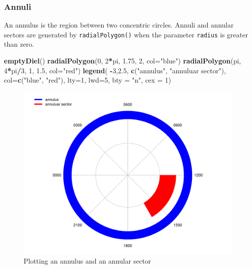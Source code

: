 \documentclass[
]{book}
\newenvironment{Shaded}{\begin{snugshade}}{\end{snugshade}}
\newcommand{\AttributeTok}[1]{\textcolor[rgb]{0.13,0.29,0.53}{#1}}
\newcommand{\DecValTok}[1]{\textcolor[rgb]{0.00,0.00,0.81}{#1}}
\newcommand{\FloatTok}[1]{\textcolor[rgb]{0.00,0.00,0.81}{#1}}
\newcommand{\FunctionTok}[1]{\textcolor[rgb]{0.13,0.29,0.53}{\textbf{#1}}}
\newcommand{\NormalTok}[1]{#1}
\newcommand{\SpecialCharTok}[1]{\textcolor[rgb]{0.81,0.36,0.00}{\textbf{#1}}}
\newcommand{\StringTok}[1]{\textcolor[rgb]{0.31,0.60,0.02}{#1}}
\begin{document}
\hypertarget{annuli}{%
\subsubsection{Annuli}\label{annuli}}

An annulus is the region between two concentric circles. Annuli and annular sectors are generated by \texttt{radialPolygon()} when the parameter \texttt{radius} is greater than zero.

\begin{Shaded}
\begin{Highlighting}[]
\FunctionTok{emptyDiel}\NormalTok{()}
\FunctionTok{radialPolygon}\NormalTok{(}\DecValTok{0}\NormalTok{, }\DecValTok{2}\SpecialCharTok{*}\NormalTok{pi, }\FloatTok{1.75}\NormalTok{, }\DecValTok{2}\NormalTok{, }\AttributeTok{col=}\StringTok{"blue"}\NormalTok{)}
\FunctionTok{radialPolygon}\NormalTok{(pi, }\DecValTok{4}\SpecialCharTok{*}\NormalTok{pi}\SpecialCharTok{/}\DecValTok{3}\NormalTok{, }\DecValTok{1}\NormalTok{, }\FloatTok{1.5}\NormalTok{, }\AttributeTok{col=}\StringTok{"red"}\NormalTok{)}
\FunctionTok{legend}\NormalTok{(}
  \SpecialCharTok{{-}}\DecValTok{3}\NormalTok{,}\FloatTok{2.5}\NormalTok{,}
  \FunctionTok{c}\NormalTok{(}\StringTok{"annulus"}\NormalTok{, }\StringTok{"annuluar sector"}\NormalTok{),}
  \AttributeTok{col=}\FunctionTok{c}\NormalTok{(}\StringTok{"blue"}\NormalTok{, }\StringTok{"red"}\NormalTok{),}
  \AttributeTok{lty=}\DecValTok{1}\NormalTok{,}
  \AttributeTok{lwd=}\DecValTok{5}\NormalTok{,}
  \AttributeTok{bty =} \StringTok{"n"}\NormalTok{,}
  \AttributeTok{cex =} \DecValTok{1}\NormalTok{)}
\end{Highlighting}
\end{Shaded}

\begin{figure}

{\centering \includegraphics[width=0.9\linewidth]{_main_files/figure-latex/radialPolygon-annuli-1} 

}

\caption{Plotting an annulus and an annular sector}\label{fig:radialPolygon-annuli}
\end{figure}
\end{document}
